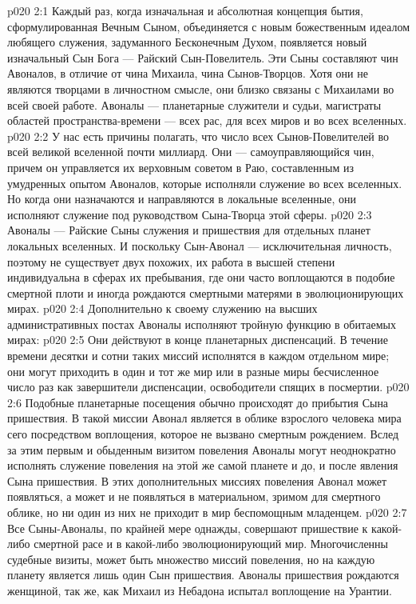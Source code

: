 \vs p020 2:1 Каждый раз, когда изначальная и абсолютная концепция бытия, сформулированная Вечным Сыном, объединяется с новым божественным идеалом любящего служения, задуманного Бесконечным Духом, появляется новый изначальный Сын Бога --- Райский Сын\hyp{}Повелитель. Эти Сыны составляют чин Авоналов, в отличие от чина Михаила, чина Сынов\hyp{}Творцов. Хотя они не являются творцами в личностном смысле, они близко связаны с Михаилами во всей своей работе. Авоналы --- планетарные служители и судьи, магистраты областей пространства\hyp{}времени --- всех рас, для всех миров и во всех вселенных.
\vs p020 2:2 У нас есть причины полагать, что число всех Сынов\hyp{}Повелителей во всей великой вселенной почти миллиард. Они --- самоуправляющийся чин, причем он управляется их верховным советом в Раю, составленным из умудренных опытом Авоналов, которые исполняли служение во всех вселенных. Но когда они назначаются и направляются в локальные вселенные, они исполняют служение под руководством Сына\hyp{}Творца этой сферы.
\vs p020 2:3 Авоналы --- Райские Сыны служения и пришествия для отдельных планет локальных вселенных. И поскольку Сын\hyp{}Авонал --- исключительная личность, поэтому не существует двух похожих, их работа в высшей степени индивидуальна в сферах их пребывания, где они часто воплощаются в подобие смертной плоти и иногда рождаются смертными матерями в эволюционирующих мирах.
\vs p020 2:4 \pc Дополнительно к своему служению на высших административных постах Авоналы исполняют тройную функцию в обитаемых мирах:
\vs p020 2:5 \bibnobreakspace {} Они действуют в конце планетарных диспенсаций. В течение времени десятки и сотни таких миссий исполнятся в каждом отдельном мире; они могут приходить в один и тот же мир или в разные миры бесчисленное число раз как завершители диспенсации, освободители спящих в посмертии.
\vs p020 2:6 \pc {}\bibnobreakspace {} Подобные планетарные посещения обычно происходят до прибытия Сына пришествия. В такой миссии Авонал является в облике взрослого человека мира сего посредством воплощения, которое не вызвано смертным рождением. Вслед за этим первым и обыденным визитом повеления Авоналы могут неоднократно исполнять служение повеления на этой же самой планете и до, и после явления Сына пришествия. В этих дополнительных миссиях повеления Авонал может появляться, а может и не появляться в материальном, зримом для смертного облике, но ни один из них не приходит в мир беспомощным младенцем.
\vs p020 2:7 \pc {}\bibnobreakspace {} Все Сыны\hyp{}Авоналы, по крайней мере однажды, совершают пришествие к какой\hyp{}либо смертной расе и в какой\hyp{}либо эволюционирующий мир. Многочисленны судебные визиты, может быть множество миссий повеления, но на каждую планету является лишь один Сын пришествия. Авоналы пришествия рождаются женщиной, так же, как Михаил из Небадона испытал воплощение на Урантии.
